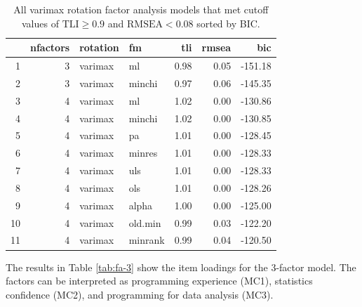 \documentclass[020-persona\_validation.tex]{subfiles}
\begin{document}
        \begin{table}[ht]
            \centering
            \caption[Factoring methods for all factor methods]
            {
                All varimax rotation factor analysis models that met cutoff values of
                $\text{TLI} \ge 0.9$ and $\text{RMSEA} < 0.08$ sorted by BIC.
            }
            \begin{tabular}{rrllrrr}
                \hline
               & nfactors & rotation & fm & tli & rmsea & bic \\
                \hline
              1 &   3 & varimax & ml & 0.98 & 0.05 & -151.18 \\
                2 &   3 & varimax & minchi & 0.97 & 0.06 & -145.35 \\
                3 &   4 & varimax & ml & 1.02 & 0.00 & -130.86 \\
                4 &   4 & varimax & minchi & 1.02 & 0.00 & -130.85 \\
                5 &   4 & varimax & pa & 1.01 & 0.00 & -128.45 \\
                6 &   4 & varimax & minres & 1.01 & 0.00 & -128.33 \\
                7 &   4 & varimax & uls & 1.01 & 0.00 & -128.33 \\
                8 &   4 & varimax & ols & 1.01 & 0.00 & -128.26 \\
                9 &   4 & varimax & alpha & 1.00 & 0.00 & -125.00 \\
                10 &   4 & varimax & old.min & 0.99 & 0.03 & -122.20 \\
                11 &   4 & varimax & minrank & 0.99 & 0.04 & -120.50 \\
                 \hline
              \end{tabular}
            \label{tab:all-good-varimax-models} %
        \end{table}

        The results in Table \ref{tab:fa-3} show the item loadings for the 3-factor model.
        The factors can be interpreted as
        programming experience (MC1),
        statistics confidence (MC2), and
        programming for data analysis (MC3).
\end{document}
